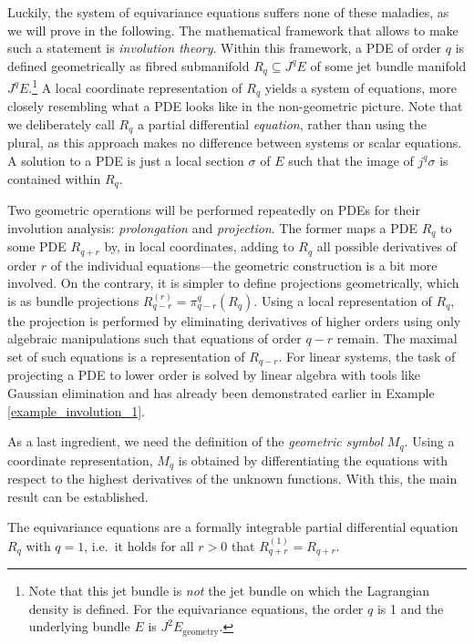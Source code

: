 Luckily, the system of equivariance equations suffers none of these maladies, as we will prove in the following. The mathematical framework that allows to make such a statement is \emph{involution theory}\cite{seiler_involution}. Within this framework, a PDE of order $q$ is defined geometrically as fibred submanifold $R_q\subseteq J^qE$ of some jet bundle manifold $J^qE$.\footnote{Note that this jet bundle is \emph{not} the jet bundle on which the Lagrangian density is defined. For the equivariance equations, the order $q$ is 1 and the underlying bundle $E$ is $J^2E_\text{geometry}$.} A local coordinate representation of $R_q$ yields a system of equations, more closely resembling what a PDE looks like in the non-geometric picture. Note that we deliberately call $R_q$ a partial differential \emph{equation}, rather than using the plural, as this approach makes no difference between systems or scalar equations. A solution to a PDE is just a local section $\sigma$ of $E$ such that the image of $j^q\sigma$ is contained within $R_q$.

Two geometric operations will be performed repeatedly on PDEs for their involution analysis: \emph{prolongation} and \emph{projection}. The former maps a PDE $R_q$ to some PDE $R_{q+r}$ by, in local coordinates, adding to $R_q$ all possible derivatives of order $r$ of the individual equations---the geometric construction is a bit more involved. On the contrary, it is simpler to define projections geometrically, which is as bundle projections $R^{(r)}_{q-r} = \pi^q_{q-r}(R_q)$. Using a local representation of $R_q$, the projection is performed by eliminating derivatives of higher orders using only algebraic manipulations such that equations of order $q-r$ remain. The maximal set of such equations is a representation of $R_{q-r}$. For linear systems, the task of projecting a PDE to lower order is solved by linear algebra with tools like Gaussian elimination and has already been demonstrated earlier in Example \ref{example_involution_1}.

As a last ingredient, we need the definition of the \emph{geometric symbol} $M_q$. Using a coordinate representation, $M_q$ is obtained by differentiating the equations with respect to the highest derivatives of the unknown functions. With this, the main result can be established.

\begin{theorem}\label{thm_formal_integrability}
  The equivariance equations are a formally integrable partial differential equation $R_q$ with $q=1$, i.e.~it holds for all $r>0$ that $R^{(1)}_{q+r} = R_{q+r}$.
\end{theorem}

